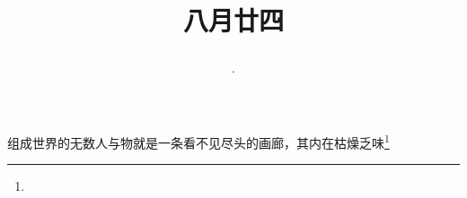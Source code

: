 \title{\date[d=26,m=9,y=2024][year:cn-y,年,month:cn,day:cn,日,·,weekday]·八月廿四 }
组成世界的无数人与物就是一条看不见尽头的画廊，其内在枯燥乏味\footnote{ }

